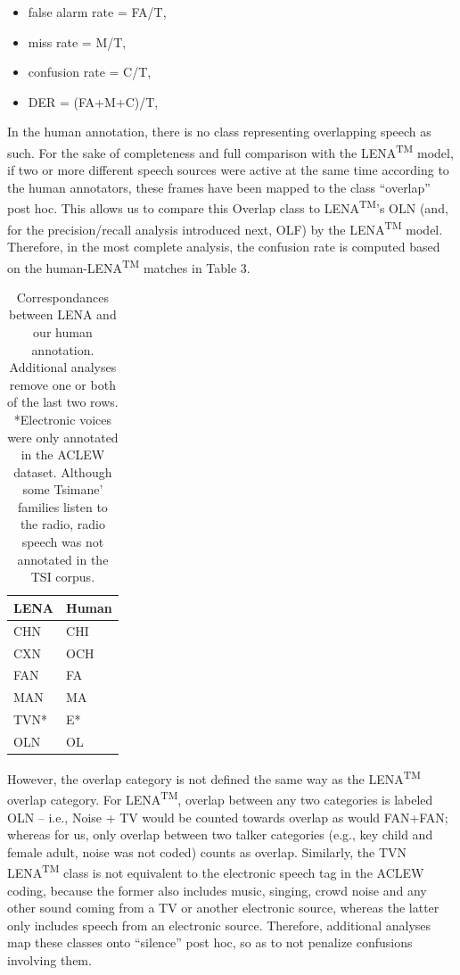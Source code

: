 \documentclass[english,floatsintext,man]{apa6}
\providecommand{\tightlist}{%
  \setlength{\itemsep}{0pt}\setlength{\parskip}{0pt}}
\begin{document}
\begin{itemize}
\tightlist
\item
  false alarm rate = FA/T,
\item
  miss rate = M/T,
\item
  confusion rate = C/T,
\item
  DER = (FA+M+C)/T,
\end{itemize}

In the human annotation, there is no class representing overlapping
speech as such. For the sake of completeness and full comparison with
the LENA\textsuperscript{TM} model, if two or more different speech
sources were active at the same time according to the human annotators,
these frames have been mapped to the class \enquote{overlap} post hoc.
This allows us to compare this Overlap class to
LENA\textsuperscript{TM}'s OLN (and, for the precision/recall analysis
introduced next, OLF) by the LENA\textsuperscript{TM} model. Therefore,
in the most complete analysis, the confusion rate is computed based on
the human-LENA\textsuperscript{TM} matches in Table 3.

\begin{table}[t]

\caption{\label{tab:tab-tsicor}Correspondances between LENA and our human annotation. Additional analyses remove one or both of the last two rows. *Electronic voices were only annotated in the ACLEW dataset. Although some Tsimane' families listen to the radio, radio speech was not annotated in the TSI corpus.}
\centering
\begin{tabular}{>{\raggedright\arraybackslash}p{2cm}>{\raggedright\arraybackslash}p{2cm}}
\toprule
LENA & Human\\
\midrule
CHN & CHI\\
CXN & OCH\\
FAN & FA\\
MAN & MA\\
TVN* & E*\\
\addlinespace
OLN & OL\\
\bottomrule
\end{tabular}
\end{table}

However, the overlap category is not defined the same way as the
LENA\textsuperscript{TM} overlap category. For LENA\textsuperscript{TM},
overlap between any two categories is labeled OLN -- i.e., Noise + TV
would be counted towards overlap as would FAN+FAN; whereas for us, only
overlap between two talker categories (e.g., key child and female adult,
noise was not coded) counts as overlap. Similarly, the TVN
LENA\textsuperscript{TM} class is not equivalent to the electronic
speech tag in the ACLEW coding, because the former also includes music,
singing, crowd noise and any other sound coming from a TV or another
electronic source, whereas the latter only includes speech from an
electronic source. Therefore, additional analyses map these classes onto
\enquote{silence} post hoc, so as to not penalize confusions involving
them.
\end{document}
